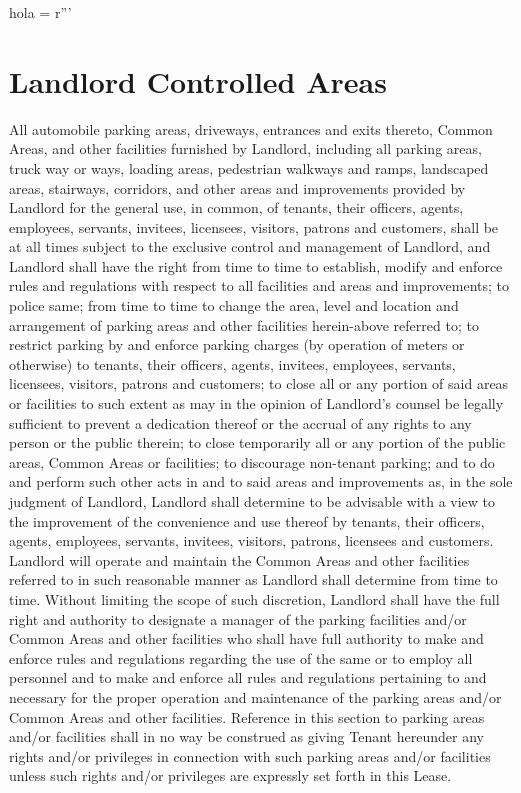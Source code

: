 hola = r'''\documentclass{article}
\begin{document}
\section{Landlord Controlled Areas}
    All automobile parking areas, driveways, entrances and exits thereto, Common Areas, and other facilities furnished by Landlord, including all parking areas, truck way or ways, loading areas, pedestrian walkways and ramps, landscaped areas, stairways, corridors, and other areas and improvements provided by Landlord for the general use, in common, of tenants, their officers, agents, employees, servants, invitees, licensees, visitors, patrons and customers, shall be at all times subject to the exclusive control and management of Landlord, and Landlord shall have the right from time to time to establish, modify and enforce rules and regulations with respect to all facilities and areas and improvements; to police same; from time to time to change the area, level and location and arrangement of parking areas and other facilities herein-above referred to; to restrict parking by and enforce parking charges (by operation of meters or otherwise) to tenants, their officers, agents, invitees, employees, servants, licensees, visitors, patrons and customers; to close all or any portion of said areas or facilities to such extent as may in the opinion of Landlord's counsel be legally sufficient to prevent a dedication thereof or the accrual of any rights to any person or the public therein; to close temporarily all or any portion of the public areas, Common Areas or facilities; to discourage non-tenant parking; and to do and perform such other acts in and to said areas and improvements as, in the sole judgment of Landlord, Landlord shall determine to be advisable with a view to the improvement of the convenience and use thereof by tenants, their officers, agents, employees, servants, invitees, visitors, patrons, licensees and customers. Landlord will operate and maintain the Common Areas and other facilities referred to in such reasonable manner as Landlord shall determine from time to time. Without limiting the scope of such discretion, Landlord shall have the full right and authority to designate a manager of the parking facilities and/or Common Areas and other facilities who shall have full authority to make and enforce rules and regulations regarding the use of the same or to employ all personnel and to make and enforce all rules and regulations pertaining to and necessary for the proper operation and maintenance of the parking areas and/or Common Areas and other facilities. Reference in this section to parking areas and/or facilities shall in no way be construed as giving Tenant hereunder any rights and/or privileges in connection with such parking areas and/or facilities unless such rights and/or privileges are expressly set forth in this Lease.
\end{document}
